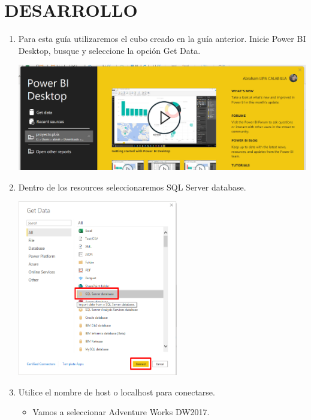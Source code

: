 \documentclass[12pt,letterpaper]{article}
\newcommand\tab[1][1cm]{\hspace*{#1}}
\begin{document}
    \newpage
    \section{DESARROLLO}
    \begin{enumerate}[\tab 1.]
        \item Para esta guía utilizaremos el cubo creado en la guía anterior. Inicie Power BI Desktop, busque y seleccione la opción Get Data.
        \begin{center}
            \includegraphics[width=13cm]{./img/img1.png}
        \end{center}
        \item Dentro de los resources seleccionaremos SQL Server database.
        \begin{center}
            \includegraphics[width=7cm]{./img/img2.png}
        \end{center}
        \item Utilice el nombre de host o localhost para conectarse.
        \begin{itemize}
            \item Vamos a seleccionar Adventure Works DW2017.
            \begin{center}

\end{center}
\end{itemize}
\end{enumerate}
\end{document}
